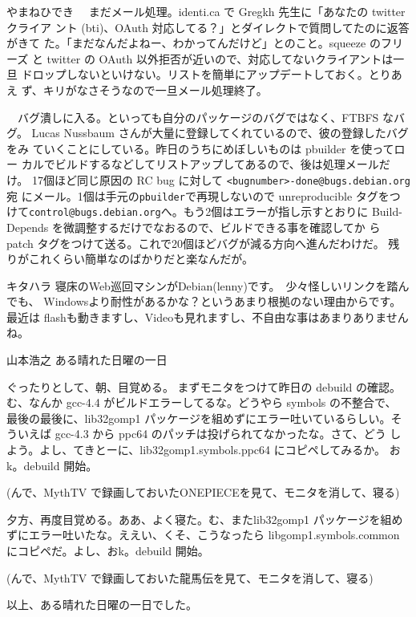 \begin{prework}{ やまねひでき }
　まだメール処理。identi.ca で Gregkh 先生に「あなたの twitter クライア
 ント (bti)、OAuth 対応してる？」とダイレクトで質問してたのに返答がきて
 た。「まだなんだよねー、わかってんだけど」とのこと。squeeze のフリーズ
 と twitter の OAuth 以外拒否が近いので、対応してないクライアントは一旦
 ドロップしないといけない。リストを簡単にアップデートしておく。とりあえ
 ず、キリがなさそうなので一旦メール処理終了。


　バグ潰しに入る。といっても自分のパッケージのバグではなく、FTBFS なバグ。
 Lucas Nussbaum さんが大量に登録してくれているので、彼の登録したバグをみ
 ていくことにしている。昨日のうちにめぼしいものは pbuilder を使ってロー
 カルでビルドするなどしてリストアップしてあるので、後は処理メールだけ。
 17個ほど同じ原因の RC bug に対して \texttt{<bugnumber>-done@bugs.debian.org}宛
 にメール。1個は手元の\texttt{pbuilder}で再現しないので unreproducible タグをつ
 けて\texttt{control@bugs.debian.org}へ。もう2個はエラーが指し示すとおりに
 Build-Depends を微調整するだけでなおるので、ビルドできる事を確認してか
 ら patch タグをつけて送る。これで20個ほどバグが減る方向へ進んだわけだ。
 残りがこれくらい簡単なのばかりだと楽なんだが。
\end{prework}

\begin{prework}{ キタハラ }
 寝床のWeb巡回マシンがDebian(lenny)です。　少々怪しいリンクを踏んでも、
 Windowsより耐性があるかな？というあまり根拠のない理由からです。　最近は
 flashも動きますし、Videoも見れますし、不自由な事はあまりありませんね。
\end{prework}

\begin{prework}{ 山本浩之 }
 ある晴れた日曜の一日

 ぐったりとして、朝、目覚める。 まずモニタをつけて昨日の debuild の確認。
 む、なんか gcc-4.4 がビルドエラーしてるな。どうやら symbols の不整合で、
 最後の最後に、lib32gomp1 パッケージを組めずにエラー吐いているらしい。そ
 ういえば gcc-4.3 から ppc64 のパッチは投げられてなかったな。さて、どう
 しよう。よし、てきとーに、lib32gomp1.symbols.ppc64 にコピペしてみるか。
 おk。debuild 開始。

 (んで、MythTV で録画しておいたONEPIECEを見て、モニタを消して、寝る)

 夕方、再度目覚める。ああ、よく寝た。む、またlib32gomp1 パッケージを組め
 ずにエラー吐いたな。ええい、くそ、こうなったら libgomp1.symbols.common
 にコピペだ。よし、おk。debuild 開始。

 (んで、MythTV で録画しておいた龍馬伝を見て、モニタを消して、寝る)

 以上、ある晴れた日曜の一日でした。
\end{prework}


